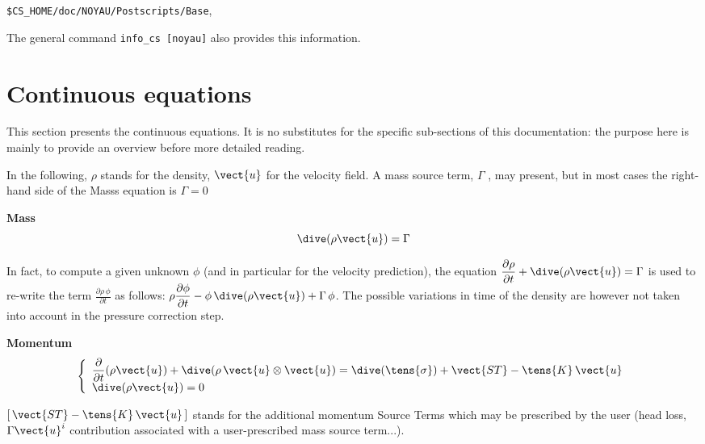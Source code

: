 \begin{center}
\texttt{\$CS\_HOME/doc/NOYAU/Postscripts/Base},
\end{center}

The general command \texttt{info\_cs [noyau]} also provides this
information.

\newpage %

\section{Continuous equations}


This section presents the continuous equations. It is no substitutes for the
specific sub-sections of this documentation: the purpose here is mainly to
provide an overview before more detailed reading.

In the following, $\rho $ stands for the density, $\vect{u}$ for the
velocity field. A mass source term, $\Gamma $ , may present, but in most
cases the right-hand side of the Masss equation is $\Gamma =0$

\textbf{Mass}\newline
\begin{equation}
\dive(\rho \vect{u})=\Gamma
\end{equation}

In fact, to compute a given unknown $\phi$ (and in particular for the
velocity prediction), the equation $\displaystyle \frac{\partial \rho}{%
\partial t} + \dive(\rho \vect{u}) = \Gamma$ is used to re-write the term $%
\displaystyle \frac{\partial \rho\,\phi}{\partial t}$ as follows:
\mbox{$\displaystyle \rho\frac{\partial  \phi}{\partial t} - \phi\,\dive(\rho \vect{u})
+ \Gamma\,\phi$}. The possible variations in time of the density are however
not taken into account in the pressure correction step.

\clearpage \textbf{Momentum}
\begin{equation}
\left\{
\begin{array}{l}
\displaystyle\frac{\partial }{\partial t}(\rho \vect{u})+\dive(\rho \,%
\vect{u}\otimes \vect{u})=\dive(\tens{\sigma})+\vect{ST}-\tens{K}\,\vect{u}
\\
\dive(\rho \vect{u})=0%
\end{array}%
\right.
\end{equation}

$[\,\vect{ST}-\tens{K}\,\vect{u}\,]$ stands for the additional momentum
Source Terms which may be prescribed by the user (head loss, $\Gamma \vect{u}%
^{i}$ contribution associated with a user-prescribed mass source term...).

